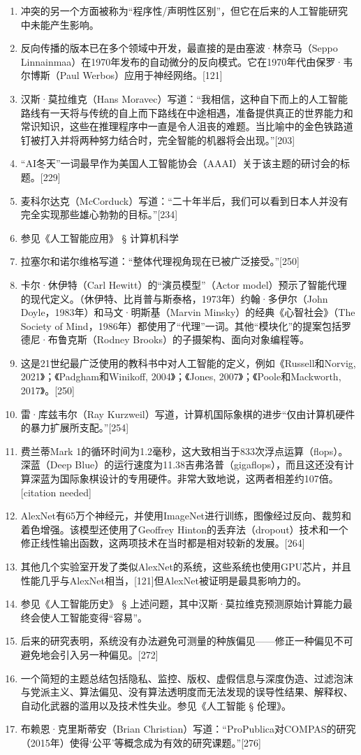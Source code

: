 \begin{enumerate}
\item 冲突的另一个方面被称为“程序性/声明性区别”，但它在后来的人工智能研究中未能产生影响。
\item 反向传播的版本已在多个领域中开发，最直接的是由塞波·林奈马（Seppo Linnainmaa）在1970年发布的自动微分的反向模式。它在1970年代由保罗·韦尔博斯（Paul Werbos）应用于神经网络。[121]
\item 汉斯·莫拉维克（Hans Moravec）写道：“我相信，这种自下而上的人工智能路线有一天将与传统的自上而下路线在中途相遇，准备提供真正的世界能力和常识知识，这些在推理程序中一直是令人沮丧的难题。当比喻中的金色铁路道钉被打入并将两种努力结合时，完全智能的机器将会出现。”[203]
\item “AI冬天”一词最早作为美国人工智能协会（AAAI）关于该主题的研讨会的标题。[229]
\item 麦科尔达克（McCorduck）写道：“二十年半后，我们可以看到日本人并没有完全实现那些雄心勃勃的目标。”[234]
\item 参见《人工智能应用》 § 计算机科学
\item 拉塞尔和诺尔维格写道：“整体代理视角现在已被广泛接受。”[250]
\item 卡尔·休伊特（Carl Hewitt）的“演员模型”（Actor model）预示了智能代理的现代定义。（休伊特、比肖普与斯泰格，1973年）约翰·多伊尔（John Doyle，1983年）和马文·明斯基（Marvin Minsky）的经典《心智社会》（The Society of Mind，1986年）都使用了“代理”一词。其他“模块化”的提案包括罗德尼·布鲁克斯（Rodney Brooks）的子摄架构、面向对象编程等。
\item 这是21世纪最广泛使用的教科书中对人工智能的定义，例如《Russell和Norvig, 2021》；《Padgham和Winikoff, 2004》；《Jones, 2007》；《Poole和Mackworth, 2017》。[250]
\item 雷·库兹韦尔（Ray Kurzweil）写道，计算机国际象棋的进步“仅由计算机硬件的暴力扩展所支配。”[254]
\item 费兰蒂Mark 1的循环时间为1.2毫秒，这大致相当于833次浮点运算（flops）。深蓝（Deep Blue）的运行速度为11.38吉弗洛普（gigaflops），而且这还没有计算深蓝为国际象棋设计的专用硬件。非常大致地说，这两者相差约107倍。[citation needed]
\item AlexNet有65万个神经元，并使用ImageNet进行训练，图像经过反向、裁剪和着色增强。该模型还使用了Geoffrey Hinton的丢弃法（dropout）技术和一个修正线性输出函数，这两项技术在当时都是相对较新的发展。[264]
\item 其他几个实验室开发了类似AlexNet的系统，这些系统也使用GPU芯片，并且性能几乎与AlexNet相当，[121]但AlexNet被证明是最具影响力的。
\item 参见《人工智能历史》 § 上述问题，其中汉斯·莫拉维克预测原始计算能力最终会使人工智能变得“容易”。
\item 后来的研究表明，系统没有办法避免可测量的种族偏见——修正一种偏见不可避免地会引入另一种偏见。[272]
\item 一个简短的主题总结包括隐私、监控、版权、虚假信息与深度伪造、过滤泡沫与党派主义、算法偏见、没有算法透明度而无法发现的误导性结果、解释权、自动化武器的滥用以及技术性失业。参见《人工智能 § 伦理》。
\item 布赖恩·克里斯蒂安（Brian Christian）写道：“ProPublica对COMPAS的研究（2015年）使得‘公平’等概念成为有效的研究课题。”[276]
\end{enumerate}
